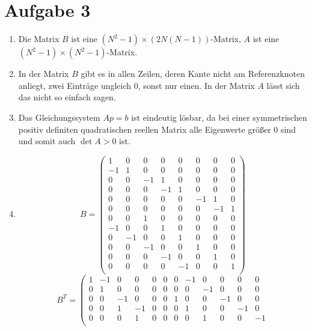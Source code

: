 \documentclass{article}
\theoremstyle{definition}
\begin{document}
\section*{Aufgabe 3}
\begin{enumerate}
	\item Die Matrix $B$ ist eine $(N^2 - 1)\times (2N(N-1))$-Matrix, $A$ ist eine $(N^2-1)\times (N^2-1)$-Matrix.
	\item In der Matrix $B$ gibt es in allen Zeilen, deren Kante nicht am Referenzknoten anliegt, zwei Einträge ungleich 0, sonst nur einen. In der Matrix $A$ lässt sich das nicht so einfach sagen.
	\item Das Gleichungssystem $Ap = b$ ist eindeutig lösbar, da bei einer symmetrischen positiv definiten quadratischen reellen Matrix alle Eigenwerte größer 0 sind und somit auch $\det A > 0$ ist.
	\item $$ B = \begin{pmatrix}
		 1 & 0 & 0 & 0 & 0 & 0 & 0 & 0\\ %
		-1 & 1 & 0 & 0 & 0 & 0 & 0 & 0\\ %
		 0 & 0 &-1 & 1 & 0 & 0 & 0 & 0\\ %
		 0 & 0 & 0 &-1 & 1 & 0 & 0 & 0\\ %
		 0 & 0 & 0 & 0 & 0 &-1 & 1 & 0\\ %
		 0 & 0 & 0 & 0 & 0 & 0 &-1 & 1\\ %
		 0 & 0 & 1 & 0 & 0 & 0 & 0 & 0\\ %
		-1 & 0 & 0 & 1 & 0 & 0 & 0 & 0\\ %
		 0 &-1 & 0 & 0 & 1 & 0 & 0 & 0\\ %
		 0 & 0 &-1 & 0 & 0 & 1 & 0 & 0\\ %
		 0 & 0 & 0 &-1 & 0 & 0 & 1 & 0\\ %
		 0 & 0 & 0 & 0 &-1 & 0 & 0 & 1\\ %
	\end{pmatrix}$$
	$$B^T = \left(\begin{array}{cccccccccccc}
		1 &-1 & 0 & 0 & 0 & 0 & 0 &-1 & 0 & 0 & 0 & 0\\
		0 & 1 & 0 & 0 & 0 & 0 & 0 & 0 &-1 & 0 & 0 & 0\\
		0 & 0 &-1 & 0 & 0 & 0 & 1 & 0 & 0 &-1 & 0 & 0\\
		0 & 0 & 1 &-1 & 0 & 0 & 0 & 1 & 0 & 0 &-1 & 0\\
		0 & 0 & 0 & 1 & 0 & 0 & 0 & 0 & 1 & 0 & 0 &-1\\

\end{array}$$
\end{enumerate}
\end{document}
